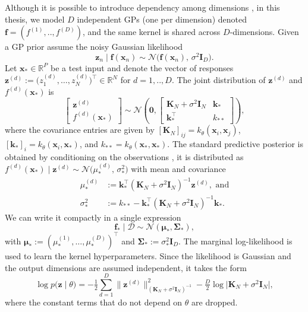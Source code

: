 Although it is possible to introduce dependency among dimensions \citep{goulard1992linear}, in this thesis, we model $D$ independent GPs (one per dimension) denoted $\mathbf{f} = (f^{(1)}, .., f^{(D)})$, and the same kernel is shared across $D$-dimensions. 
Given a  GP prior assume the noisy Gaussian likelihood
 \[
\boldsymbol z_n\mid \mathbf f(\boldsymbol{x}_n) \sim \mathcal N\!\bigl(\mathbf f(\boldsymbol{x}_n),\,\sigma^2\mathbf I_D\bigr).
\]
Let $\boldsymbol{x}_*\in\mathbb{R}^P$ be a test input and denote the vector of responses $\boldsymbol{z}^{(d)} := \bigl(z_1^{(d)},\ldots,z_N^{(d)}\bigr)^\top \in \mathbb{R}^N$ for $d=1,..,D$. The joint distribution of $\boldsymbol{z}^{(d)}$ and $f^{(d)}(\boldsymbol{x}_*)$ is
\begin{equation*}
\begin{bmatrix}
\boldsymbol{z}^{(d)} \\
f^{(d)}(\boldsymbol{x}_*)
\end{bmatrix}
\sim
\mathcal{N}\!\left(
\boldsymbol{0},
\begin{bmatrix}
\mathbf{K}_N + \sigma^2 \mathbf{I}_N & \mathbf{k}_* \\
\mathbf{k}_*^\top & k_{**}
\end{bmatrix}
\right),
\end{equation*}
where the covariance entries are given by
$[\mathbf{K}_N]_{ij} = k_\theta(\boldsymbol{x}_i,\boldsymbol{x}_j)$, $[\mathbf{k}_*]_i = k_\theta(\boldsymbol{x}_i,\boldsymbol{x}_*)$, and $k_{**} = k_\theta(\boldsymbol{x}_*,\boldsymbol{x}_*)$.
The standard predictive posterior is obtained by conditioning on the observations  \citep{williams2006gaussian}, it is distributed as
$f^{(d)}(\boldsymbol{x}_*) \mid \boldsymbol{z}^{(d)}
\sim
\mathcal{N}\!\bigl(\mu_*^{(d)},\,\sigma_*^2\bigr)$ with mean and covariance
\begin{equation}
\begin{aligned}
\mu_*^{(d)} &:=\mathbf k_*^\top(\mathbf{K}_{N}+\sigma^2\mathbf I_N)^{-1}\boldsymbol z^{(d)}, \text{ and}\\
\sigma_*^2 &:= k_{**}-\mathbf k_*^\top(\mathbf{K}_{N}+\sigma^2\mathbf I_N)^{-1}\mathbf k_*.
\end{aligned}
\label{eq:gp_posterior}
\end{equation}
We can write it compactly in a single expression
\begin{equation*}
 \mathbf f_*\mid\mathcal D\sim\mathcal N(\boldsymbol\mu_*,\boldsymbol\Sigma_*),   
\end{equation*}
with $\boldsymbol\mu_*:=(\mu_*^{(1)},\ldots,\mu_*^{(D)})^\top$ and $\boldsymbol\Sigma_*:=\sigma_*^2\mathbf I_D$. The marginal log-likelihood is used to learn the kernel hyperparameters. Since the likelihood is Gaussian and the output dimensions are assumed independent, it takes the form 
\begin{equation}
\log p\bigl(\boldsymbol{z} \mid \theta\bigr)
= -\tfrac12\sum_{d=1}^D \|\boldsymbol z^{(d)}\|^2_{(\mathbf{K}_{N}+\sigma^2\mathbf I_N)^{-1}}
- \tfrac{D}{2}\log\lvert\mathbf{K}_{N}+\sigma^2\mathbf I_N\rvert, 
\label{eq:mll}
\end{equation}
where the constant terms that do not depend on $\theta$ are dropped.

